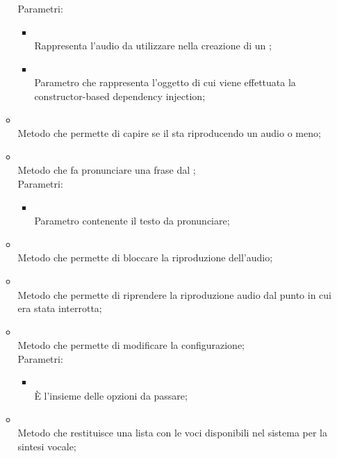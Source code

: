 \begin{itemize}
\begin{itemize}
		Parametri:
		\begin{itemize}
			\item {} \\
			Rappresenta l'audio da utilizzare nella creazione di un ;
			\item {} \\
			Parametro che rappresenta l'oggetto  di cui viene effettuata la constructor-based dependency injection;
		\end{itemize}
		\item[]  \\		Metodo che permette di capire se il  sta riproducendo un audio o meno;\\
		\item[]  \\		Metodo che fa pronunciare una frase dal ;\\
		Parametri:
		\begin{itemize}
			\item {} \\
			Parametro contenente il testo da pronunciare;
		\end{itemize}
		\item[]  \\		Metodo che permette di bloccare la riproduzione dell'audio;\\
		\item[]  \\		Metodo che permette di riprendere la riproduzione audio dal punto in cui era stata interrotta;\\
		\item[]  \\		Metodo che permette di modificare la configurazione;\\
		Parametri:
		\begin{itemize}
			\item {} \\
			È l'insieme delle opzioni da passare;
		\end{itemize}
		\item[]  \\		Metodo che restituisce una lista con le voci disponibili nel sistema per la sintesi vocale;\\

\end{itemize}
\end{itemize}

